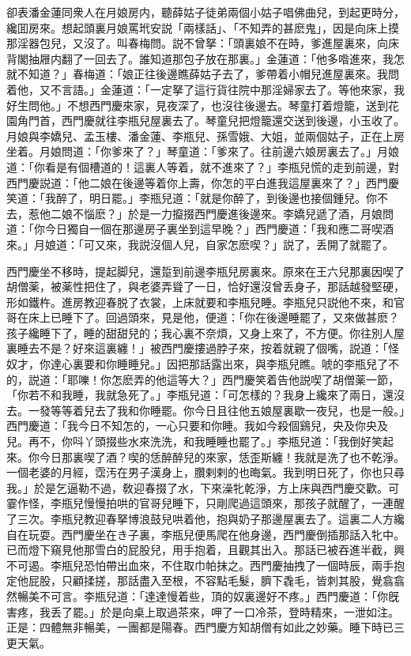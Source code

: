 卻表潘金蓮同衆人在月娘房内，聽薛姑子徒弟兩個小姑子唱佛曲兒，到起更時分，纔囬房來。想起頭裏月娘罵玳安説「兩樣話」、「不知弄的甚麽鬼」，因是向床上摸那淫器包兒，又沒了。叫春梅問。説不曾拏：「頭裏娘不在時，爹進屋裏來，向床背閣抽屜内翻了一回去了。誰知道那包子放在那裏。」金蓮道：「他多喒進來，我怎就不知道？」春梅道：「娘正往後邊瞧薛姑子去了，爹帶着小帽兒進屋裏來。我問着他，又不言語。」金蓮道：「一定拏了這行貨往院中那淫婦家去了。等他來家，我好生問他。」不想西門慶來家，見夜深了，也沒往後邊去。琴童打着燈籠，送到花園角門首，西門慶就往李瓶兒屋裏去了。琴童兒把燈籠還交送到後邊，小玉收了。月娘與李嬌兒、孟玉樓、潘金蓮、李瓶兒、孫雪娥、大姐，並兩個姑子，正在上房坐着。月娘問道：「你爹來了？」琴童道：「爹來了。往前邊六娘房裏去了。」月娘道：「你看是有個槽道的！這裏人等着，就不進來了？」李瓶兒慌的走到前邊，對西門慶説道：「他二娘在後邊等着你上壽，你怎的平白進我這屋裏來了？」西門慶笑道：「我醉了，明日罷。」李瓶兒道：「就是你醉了，到後邊也接個鍾兒。你不去，惹他二娘不惱麽？」於是一力攛掇西門慶進後邊來。李嬌兒遞了酒，月娘問道：「你今日獨自一個在那邊房子裏坐到這早晚？」西門慶道：「我和應二哥喫酒來。」月娘道：「可又來，我説沒個人兒，自家怎麽喫？」説了，丢開了就罷了。

西門慶坐不移時，提起脚兒，還踅到前邊李瓶兒房裏來。原來在王六兒那裏因喫了胡僧薬，被薬性把住了，與老婆弄聳了一日，恰好還沒曾丢身子，那話越發堅硬，形如鐵杵。進房教迎春脱了衣裳，上床就要和李瓶兒睡。李瓶兒只説他不來，和官哥在床上已睡下了。回過頭來，見是他，便道：「你在後邊睡罷了，又來做甚麽？孩子纔睡下了，睡的甜甜兒的；我心裏不奈煩，又身上來了，不方便。你往別人屋裏睡去不是？好來這裏纏！」被西門慶摟過脖子來，按着就親了個嘴，説道：「怪奴才，你達心裏要和你睡睡兒。」因把那話露出來，與李瓶兒瞧。唬的李瓶兒了不的，説道：「耶嚛！你怎麽弄的他這等大？」西門慶笑着告他説喫了胡僧薬一節，「你若不和我睡，我就急死了。」李瓶兒道：「可怎樣的？我身上纔來了兩日，還沒去。一發等等着兒去了我和你睡罷。你今日且往他五娘屋裏歇一夜兒，也是一般。」西門慶道：「我今日不知怎的，一心只要和你睡。我如今殺個鷄兒，央及你央及兒。再不，你呌丫頭掇些水來洗洗，和我睡睡也罷了。」李瓶兒道：「我倒好笑起來。你今日那裏喫了酒？喫的恁醉醉兒的來家，恁歪斯纏！我就是洗了也不乾淨。一個老婆的月經，霑汚在男子漢身上，臢剌剌的也晦氣。我到明日死了，你也只尋我。」於是乞逼勒不過，敎迎春掇了水，下來澡牝乾淨，方上床與西門慶交歡。可霎作怪，李瓶兒慢慢拍哄的官哥兒睡下，只剛爬過這頭來，那孩子就醒了，一連醒了三次。李瓶兒教迎春拏博浪鼓兒哄着他，抱與奶子那邊屋裏去了。這裏二人方纔自在玩耍。西門慶坐在き子裏，李瓶兒便馬爬在他身邊，西門慶倒插那話入牝中。已而燈下窺見他那雪白的屁股兒，用手抱着，且觀其出入。那話已被吞進半截，興不可遏。李瓶兒恐怕帶出血來，不住取巾帕抹之。西門慶抽拽了一個時辰，兩手抱定他屁股，只顧揉搓，那話盡入至根，不容點毛髮，臍下毳毛，皆刺其股，覺翕翕然暢美不可言。李瓶兒道：「達達慢着些，頂的奴裏邊好不疼。」西門慶道：「你旣害疼，我丢了罷。」於是向桌上取過茶來，呷了一口冷茶，登時精來，一泄如注。正是：四體無非暢美，一團都是陽春。西門慶方知胡僧有如此之妙藥。睡下時已三更天氣。

